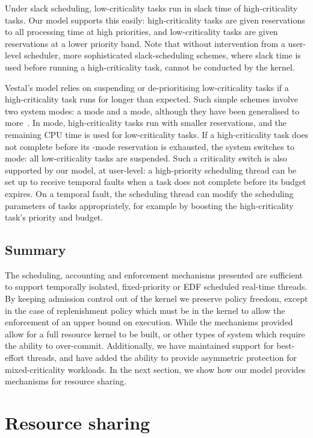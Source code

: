 Under slack scheduling, low-criticality tasks run in slack time of high-criticality tasks.  Our
model supports this easily: high-criticality tasks are given reservations to all processing time at
high priorities, and low-criticality tasks are given reservations at a lower priority band. Note
that without intervention from a user-level scheduler, more sophisticated slack-scheduling schemes,
where slack time is used before running a high-criticality task, cannot be conducted by the kernel.

Vestal's model relies on suspending or de-prioritising low-criticality tasks if a high-criticality
task runs for longer than expected.  Such simple schemes involve two system modes:
a  mode and a  mode, although they have been generalised to
more~\citep{Fleming_Burns_13}.  In  mode, high-criticality tasks run with smaller 
reservations, and the remaining
CPU time is used for low-criticality tasks.  If a high-criticality task does not complete before its
-mode reservation is exhausted, the system switches to  mode: all low-criticality
tasks are suspended.  Such a criticality switch is also supported by our model, at user-level: a high-priority scheduling thread can be
set up to receive temporal faults when a task does not complete before its budget expires.  On a
temporal fault, the scheduling thread can modify the scheduling parameters of tasks appropriately,
for example by boosting the high-criticality task's priority and budget.

\subsection{Summary}

The scheduling, accounting and enforcement mechanisms presented are sufficient to support temporally
isolated, fixed-priority or \gls{EDF} scheduled real-time threads. By keeping admission control
out of the kernel we preserve policy freedom, except in the case of replenishment policy which must
be in the kernel to allow the enforcement of an upper bound on execution. While the mechanisms provided allow for a full
resource kernel to be built, or other types of system which require the ability to over-commit.
Additionally, we have maintained
support for best-effort threads, and have added the ability to provide asymmetric protection for
mixed-criticality workloads. 
In the next section, we show how our model provides mechanisms for resource sharing. 

\section{Resource sharing}\label{s:locking}

